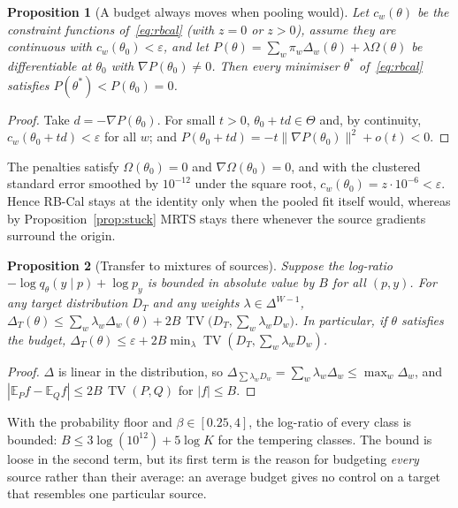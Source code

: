 \documentclass[11pt]{article}
\newtheorem{proposition}{Proposition}
\theoremstyle{remark}
\newcommand{\E}{\mathbb{E}}
\newcommand{\TV}{\operatorname{TV}}
\begin{document}
\begin{proposition}[A budget always moves when pooling would]\label{prop:escape}
Let $c_w(\theta)$ be the constraint functions of~\eqref{eq:rbcal} (with $z=0$ or $z>0$), assume they are continuous with $c_w(\theta_0)<\varepsilon$, and let $P(\theta)=\sum_w\pi_w\Delta_w(\theta)+\lambda\Omega(\theta)$ be differentiable at $\theta_0$ with $\nabla P(\theta_0)\ne0$.
Then every minimiser $\theta^\ast$ of~\eqref{eq:rbcal} satisfies $P(\theta^\ast)<P(\theta_0)=0$.
\end{proposition}
\begin{proof}
Take $d=-\nabla P(\theta_0)$.
For small $t>0$, $\theta_0+td\in\Theta$ and, by continuity, $c_w(\theta_0+td)<\varepsilon$ for all $w$; and $P(\theta_0+td)=-t\|\nabla P(\theta_0)\|^2+o(t)<0$.
\end{proof}
The penalties satisfy $\Omega(\theta_0)=0$ and $\nabla\Omega(\theta_0)=0$, and with the clustered standard error smoothed by $10^{-12}$ under the square root, $c_w(\theta_0)=z\cdot10^{-6}<\varepsilon$.
Hence RB-Cal stays at the identity only when the pooled fit itself would, whereas by Proposition~\ref{prop:stuck} MRTS stays there whenever the source gradients surround the origin.

\begin{proposition}[Transfer to mixtures of sources]\label{prop:transfer}
Suppose the log-ratio $-\log q_\theta(y\mid p)+\log p_y$ is bounded in absolute value by $B$ for all $(p,y)$.
For any target distribution $D_T$ and any weights $\lambda\in\Delta^{W-1}$,
$\Delta_T(\theta)\le\sum_w\lambda_w\Delta_w(\theta)+2B\,\TV\big(D_T,\textstyle\sum_w\lambda_wD_w\big)$.
In particular, if $\theta$ satisfies the budget, $\Delta_T(\theta)\le\varepsilon+2B\min_\lambda\TV(D_T,\sum_w\lambda_wD_w)$.
\end{proposition}
\begin{proof}
$\Delta$ is linear in the distribution, so $\Delta_{\sum\lambda_wD_w}=\sum_w\lambda_w\Delta_w\le\max_w\Delta_w$, and $|\E_Pf-\E_Qf|\le2B\,\TV(P,Q)$ for $|f|\le B$.
\end{proof}
With the probability floor and $\beta\in[0.25,4]$, the log-ratio of every class is bounded: $B\le3\log(10^{12})+5\log K$ for the tempering classes.
The bound is loose in the second term, but its first term is the reason for budgeting \emph{every} source rather than their average: an average budget gives no control on a target that resembles one particular source.
\end{document}
